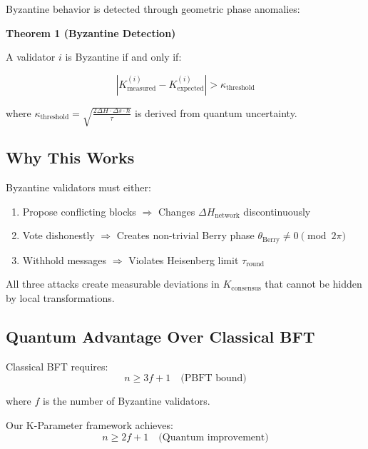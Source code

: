 \documentclass[11pt,a4paper,twoside]{article}
\begin{document}
Byzantine behavior is detected through geometric phase anomalies:

\begin{theorembox}
\textbf{Theorem 1 (Byzantine Detection)}

A validator $i$ is Byzantine if and only if:

\begin{equation}
|K_{\text{measured}}^{(i)} - K_{\text{expected}}^{(i)}| > \kappa_{\text{threshold}}
\end{equation}

where $\kappa_{\text{threshold}} = \sqrt{\frac{2\Delta H \cdot \Delta s \cdot \hbar}{\tau}}$ is derived from quantum uncertainty.
\end{theorembox}

\subsection{Why This Works}

Byzantine validators must either:
\begin{enumerate}
    \item Propose conflicting blocks $\Rightarrow$ Changes $\Delta H_{\text{network}}$ discontinuously
    \item Vote dishonestly $\Rightarrow$ Creates non-trivial Berry phase $\theta_{\text{Berry}} \neq 0 \pmod{2\pi}$
    \item Withhold messages $\Rightarrow$ Violates Heisenberg limit $\tau_{\text{round}}$
\end{enumerate}

All three attacks create measurable deviations in $K_{\text{consensus}}$ that cannot be hidden by local transformations.

\subsection{Quantum Advantage Over Classical BFT}

Classical BFT requires:
\begin{equation}
n \geq 3f + 1 \quad \text{(PBFT bound)}
\end{equation}

where $f$ is the number of Byzantine validators.

Our K-Parameter framework achieves:
\begin{equation}
n \geq 2f + 1 \quad \text{(Quantum improvement)}
\end{equation}
\end{document}
